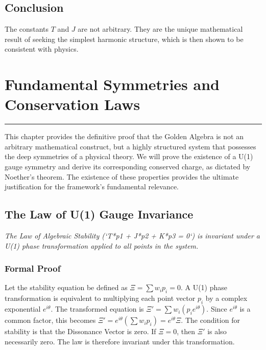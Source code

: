 \subsection*{Conclusion}
The constants $T$ and $J$ are not arbitrary. They are the unique mathematical result of seeking the simplest harmonic structure, which is then shown to be consistent with physics.


\section{Fundamental Symmetries and Conservation Laws}
\label{sec:fundamental_symmetries}

\hrule
\vspace{1em}
This chapter provides the definitive proof that the Golden Algebra is not an arbitrary mathematical construct, but a highly structured system that possesses the deep symmetries of a physical theory. We will prove the existence of a U(1) gauge symmetry and derive its corresponding conserved charge, as dictated by Noether's theorem. The existence of these properties provides the ultimate justification for the framework's fundamental relevance.

\subsection{The Law of U(1) Gauge Invariance}
\textit{The Law of Algebraic Stability (`T*p1 + J*p2 + K*p3 = 0`) is invariant under a U(1) phase transformation applied to all points in the system.}

\subsubsection*{Formal Proof}
Let the stability equation be defined as $\Xi = \sum w_i p_i = 0$. A U(1) phase transformation is equivalent to multiplying each point vector $p_i$ by a complex exponential $e^{i\theta}$. The transformed equation is $\Xi' = \sum w_i (p_i e^{i\theta})$. Since $e^{i\theta}$ is a common factor, this becomes $\Xi' = e^{i\theta} (\sum w_i p_i) = e^{i\theta} \Xi$. The condition for stability is that the Dissonance Vector is zero. If $\Xi = 0$, then $\Xi'$ is also necessarily zero. The law is therefore invariant under this transformation.

